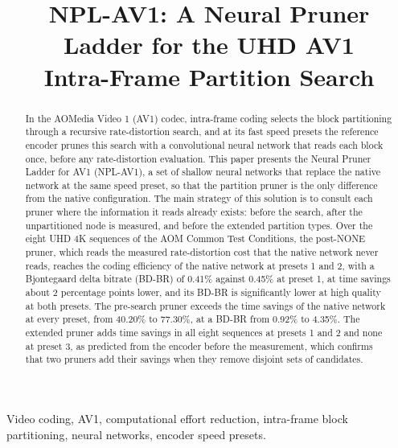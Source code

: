 \documentclass[conference]{IEEEtran}
\begin{document}
\title{NPL-AV1: A Neural Pruner Ladder for the UHD AV1\\ Intra-Frame Partition Search}

\author{
}

\maketitle

\begin{abstract}
In the AOMedia Video 1 (AV1) codec, intra-frame coding selects the block
partitioning through a recursive rate-distortion search, and at its fast speed
presets the reference encoder prunes this search with a convolutional neural
network that reads each block once, before any rate-distortion evaluation. This
paper presents the Neural Pruner Ladder for AV1 (NPL-AV1), a set of shallow
neural networks that replace the native network at the same speed preset, so
that the partition pruner is the only difference from the native configuration.
The main strategy of this solution is to consult each pruner where the
information it reads already exists: before the search, after the unpartitioned
node is measured, and before the extended partition types. Over the eight UHD
4K sequences of the AOM Common Test Conditions, the post-NONE pruner, which reads
the measured rate-distortion cost that the native network never reads, reaches
the coding efficiency of the native network at presets 1 and 2, with a
Bjontegaard delta bitrate (BD-BR) of 0.41\% against 0.45\% at preset 1, at time
savings about 2 percentage points lower, and its BD-BR is significantly lower at
high quality at both presets. The pre-search pruner exceeds the time savings of
the native network at every preset, from 40.20\% to 77.30\%, at a BD-BR from
0.92\% to 4.35\%. The extended pruner adds time savings in all eight sequences at
presets 1 and 2 and none at preset 3, as predicted from the encoder before the
measurement, which confirms that two pruners add their savings when they remove
disjoint sets of candidates.
\end{abstract}

\begin{IEEEkeywords}
Video coding, AV1, computational effort reduction, intra-frame block
partitioning, neural networks, encoder speed presets.
\end{IEEEkeywords}
\end{document}
